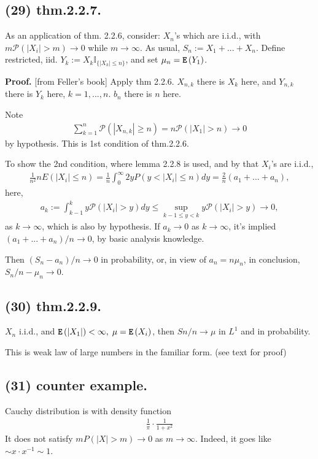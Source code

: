 \documentclass[12pt]{article}
\newcommand\oo\infty%
\newcommand\F\frac%
\newcommand\M\cdot%
\newcommand{\Rb}[1]{ \left( #1 \right) }%
\newcommand{\BF}[1]{ \mathbb{#1} }%
\newcommand{\CF}[1]{ \mathcal{#1} }%
\newcommand{\Ss}[1]{\textsf{\textbf{#1}}}%
\newcommand{\Tw}[1]{\texttt{\textbf{#1}}}%
\newcommand{\EqGo}[1]{ \begin{gather*}{#1}\end{gather*} } %
\renewcommand{\P}[1]{ \CF{P} \Rb{#1} }%
\newcommand{\E}[1]{ \Tw{E}\Rb{#1} }%
\newcommand{\I}[1]{ \BF I_{\{#1\}} }%
\begin{document}
\subsection*{(29) thm.2.2.7.} As an application of thm. 2.2.6, consider: 
\(X_n\)'s which are i.i.d., with\\ \(m \P{|X_i|>m} \to 0\) while \(m \to \oo\). 
As usual, \(S_n := X_1+...+X_n\). 
Define restricted, iid. \(Y_k := X_k \I{|X_k|\leq n}\), and set \(\mu_n = \E{Y_1}\). \par
\Ss{Proof.} [from Feller's book] Apply thm 2.2.6. 
\(X_{n,k}\) there is \(X_k\) here, 
and \(Y_{n,k}\) there is \(Y_k\) here, \(k=1,...,n\). 
\(b_n\) there is \(n\) here. \par
Note \EqGo{
 \sum_{k=1}^n \P{|X_{n,k}| \geq n} = n \P{|X_1|>n} \to 0
} by hypothesis. This is 1st condition of thm.2.2.6. \par
To show the 2nd condition, where lemma 2.2.8 is used, and by that \(X_i\)'s are i.i.d., \EqGo{
 \F{1}{n^2} n E(|X_i|\leq n) 
 = \F{1}{n} \int_0^\oo 2y P(y< |X_i|\leq n) dy
 = \F{2}{n} (a_1+...+a_n), 
} here, \EqGo{
 a_k := \int_{k-1}^k y \P{|X_i| >y} dy \leq \sup_{k-1 \leq y < k} y \P{|X_i| >y} \to 0,
} as \(k \to \oo\), which is also by hypothesis. 
If \(a_k \to 0\) as \(k \to \oo\), 
it's implied \((a_1+...+a_n)/n \to 0\), by basic analysis knowledge. \par
Then \((S_n - a_n) /n \to 0\) in probability, or, in view of \(a_n = n\mu_n\), in conclusion, \(S_n /n - \mu_n \to 0\). 

\subsection*{(30) thm.2.2.9.} \(X_n\) i.i.d., and \(\E{|X_1|} < \oo,\; \mu = \E{X_i}\), 
then \(Sn/n \to \mu\) in \(L^1\) and in probability. \par
This is weak law of large numbers in the familiar form. (see text for proof)

\subsection*{(31) counter example.} Cauchy distribution is with density function \EqGo{
 \F{1}{\pi} \M \F{1}{1+x^2}
} It does not satisfy \(m P(|X| > m) \to 0\) as \(m \to \oo\). 
Indeed, it goes like \(\sim x \M x^{-1} \sim 1\). 
\end{document}
